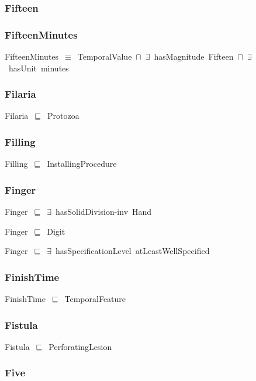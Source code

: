 \documentclass{article}
\begin{document}
\subsubsection*{Fifteen}

\subsubsection*{FifteenMinutes}

FifteenMinutes~\ensuremath{\equiv}~TemporalValue~\ensuremath{\sqcap}~\ensuremath{\exists}~hasMagnitude~Fifteen~\ensuremath{\sqcap}~\ensuremath{\exists}~hasUnit~minutes

\subsubsection*{Filaria}

Filaria~\ensuremath{\sqsubseteq}~Protozoa~

\subsubsection*{Filling}

Filling~\ensuremath{\sqsubseteq}~InstallingProcedure~

\subsubsection*{Finger}

Finger~\ensuremath{\sqsubseteq}~\ensuremath{\exists}~hasSolidDivision-inv~Hand~

Finger~\ensuremath{\sqsubseteq}~Digit~

Finger~\ensuremath{\sqsubseteq}~\ensuremath{\exists}~hasSpecificationLevel~atLeastWellSpecified~

\subsubsection*{FinishTime}

FinishTime~\ensuremath{\sqsubseteq}~TemporalFeature~

\subsubsection*{Fistula}

Fistula~\ensuremath{\sqsubseteq}~PerforatingLesion~

\subsubsection*{Five}
\end{document}
